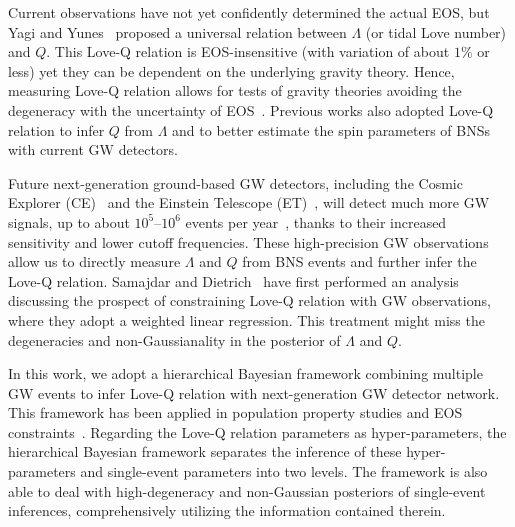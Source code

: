 \documentclass[a4paper,11pt]{article}
\begin{document}
Current observations have not yet confidently determined the actual EOS, but Yagi and Yunes~\cite{Yagi:2013bca, Yagi:2013awa} proposed a universal relation between $\Lambda$ (or tidal Love number) and $Q$. This Love-Q relation is EOS-insensitive (with variation of about $1\%$ or less) yet they can be dependent on the underlying gravity theory. Hence, measuring Love-Q relation allows for tests of gravity theories avoiding the degeneracy with the uncertainty of EOS~\cite{Yagi:2013bca, Silva:2020acr, Shao:2022koz}. Previous works also adopted Love-Q relation to infer $Q$ from $\Lambda$ and to better estimate the spin parameters of BNSs~\cite{Yagi:2013bca, LIGOScientific:2018cki, LIGOScientific:2018hze, LIGOScientific:2020aai} with current GW detectors. 

Future next-generation ground-based GW detectors, including the Cosmic Explorer (CE)~\cite{Reitze:2019iox, Reitze:2019dyk} and the Einstein Telescope (ET)~\cite{Punturo:2010zz, Hild:2010id, Sathyaprakash:2012jk}, will detect much more GW signals, up to about $10^5$--$10^6$ events per year~\cite{LIGOScientific:2017zlf, Sathyaprakash:2019yqt, Kalogera:2021bya, Samajdar:2021egv}, thanks to their increased sensitivity and lower cutoff frequencies. These high-precision GW observations allow us to directly measure $\Lambda$ and $Q$ from BNS events and further infer the Love-Q relation. Samajdar and Dietrich~\cite{Samajdar:2020xrd} have first performed an analysis discussing the prospect of constraining Love-Q relation with GW observations, where they adopt a weighted linear regression. This treatment might miss the degeneracies and non-Gaussianality in the posterior of $\Lambda$ and $Q$. 

In this work, we adopt a hierarchical Bayesian framework combining multiple GW events to infer Love-Q relation with next-generation GW detector network. This framework has been applied in population property studies and EOS constraints~\cite{Mandel:2009nx, Mandel:2009pc, Adams:2012qw, Lackey:2014fwa, Mandel:2018mve, Thrane_2019, KAGRA:2021duu, Wang:2024xon}. Regarding the Love-Q relation parameters as hyper-parameters, the hierarchical Bayesian framework separates the inference of these hyper-parameters and single-event parameters into two levels. The framework is also able to deal with high-degeneracy and non-Gaussian posteriors of single-event inferences, 
comprehensively utilizing the information contained therein. 
\end{document}
